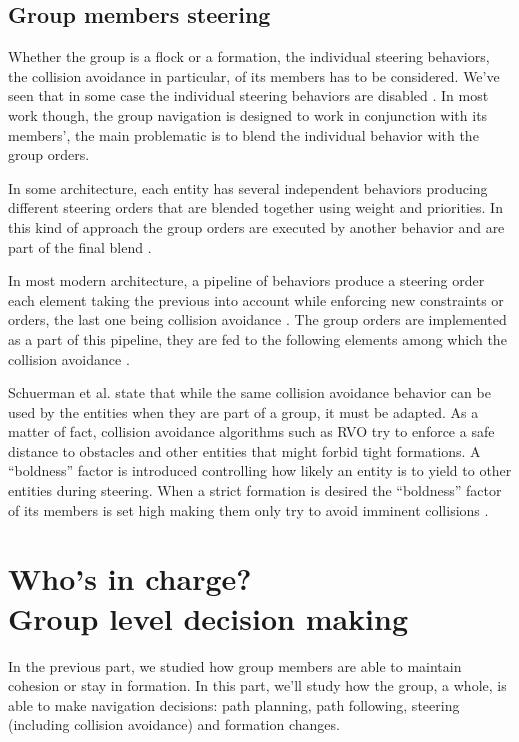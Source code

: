 \documentclass{article}
\newcommand{\sectionwithsubtitle}[2]{\section[#1]{#1\\[1ex]\large#2}}
\begin{document}
\subsection{Group members steering}

Whether the group is a flock or a formation, the individual steering behaviors, the collision avoidance in particular, of its members has to be considered. We’ve seen that in some case the individual steering behaviors are disabled \cite{Pottinger:1999vk}. In most work though, the group navigation is designed to work in conjunction with its members’, the main problematic is to blend the individual behavior with the group orders.

In some architecture, each entity has several independent behaviors producing different steering orders that are blended together using weight and priorities. In this kind of approach the group orders are executed by another behavior and are part of the final blend \cite{Moussaid:2010ib,Qiu:2010ww,Hostetler:2002wg}. 

In most modern architecture, a pipeline of behaviors produce a steering order each element taking the previous into account while enforcing new constraints or orders, the last one being collision avoidance \cite{GolaemPath:tw,Mononen:2010wp}. The group orders are implemented as a part of this pipeline, they are fed to the following elements among which the collision avoidance \cite{Karamouzas:2010fi,Silveira:2008bc}. 

Schuerman et al. state that while the same collision avoidance behavior can be used by the entities when they are part of a group, it must be adapted. As a matter of fact, collision avoidance algorithms such as RVO \cite{vandenBerg:2008tu} try to enforce a safe distance to obstacles and other entities that might forbid tight formations. A “boldness” factor is introduced controlling how likely an entity is to yield to other entities during steering. When a strict formation is desired the “boldness” factor of its members is set high making them only try to avoid imminent collisions \cite{Schuerman:2010um}.

\sectionwithsubtitle{Who's in charge?}{Group level decision making}

In the previous part, we studied how group members are able to maintain cohesion or stay in formation. In this part, we’ll study how the group, a whole, is able to make navigation decisions: path planning, path following, steering (including collision avoidance) and formation changes. 
\end{document}
